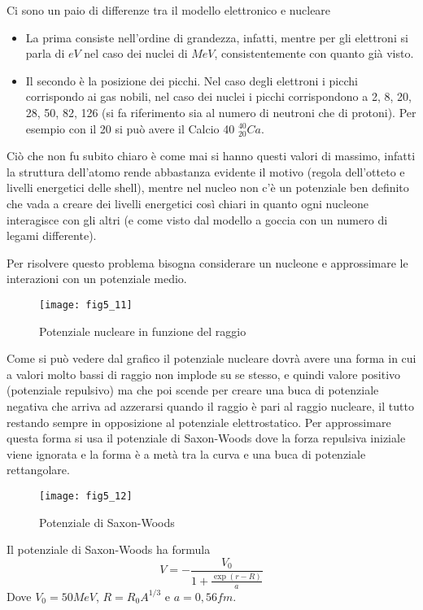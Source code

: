 Ci sono un paio di differenze tra il modello elettronico e nucleare
\begin{itemize}
\item La prima consiste nell'ordine di grandezza, infatti, mentre per gli elettroni si parla di $eV$ nel caso dei nuclei di $MeV$, consistentemente con quanto già visto.

\item Il secondo è la posizione dei picchi.
Nel caso degli elettroni i picchi corrispondo ai gas nobili, nel caso dei nuclei i picchi corrispondono a 2, 8, 20, 28, 50, 82, 126 (si fa riferimento sia al numero di neutroni che di protoni).
Per esempio con il 20 si può avere il Calcio 40 $^{40}_{20}Ca$.
\end{itemize}

Ciò che non fu subito chiaro è come mai si hanno questi valori di massimo, infatti la struttura dell'atomo rende abbastanza evidente il motivo (regola dell'otteto e livelli energetici delle shell), mentre nel nucleo non c'è un potenziale ben definito che vada a creare dei livelli energetici così chiari in quanto ogni nucleone interagisce con gli altri (e come visto dal modello a goccia con un numero di legami differente).

Per risolvere questo problema bisogna considerare un nucleone e approssimare le interazioni con un potenziale medio.
\begin{figure}[h]
\centering
\texttt{[image: fig5\_11]}
\caption{Potenziale nucleare in funzione del raggio}
\end{figure}

Come si può vedere dal grafico il potenziale nucleare dovrà avere una forma in cui a valori molto bassi di raggio non implode su se stesso, e quindi valore positivo (potenziale repulsivo) ma che poi scende per creare una buca di potenziale negativa che arriva ad azzerarsi quando il raggio è pari al raggio nucleare, il tutto restando sempre in opposizione al potenziale elettrostatico.
Per approssimare questa forma si usa il potenziale di Saxon-Woods dove la forza repulsiva iniziale viene ignorata e la forma è a metà tra la curva e una buca di potenziale rettangolare.
\begin{figure}
\centering
\texttt{[image: fig5\_12]}
\caption{Potenziale di Saxon-Woods}
\end{figure}

Il potenziale di Saxon-Woods ha formula
\begin{equation}
V=-\frac{V_0}{1+\frac{\exp(r-R)}{a}}
\end{equation}
Dove $V_0=50MeV$, $R=R_0A^{1/3}$ e $a=0,56fm$.

